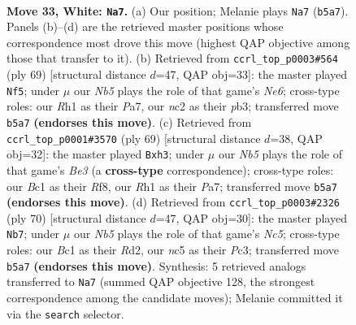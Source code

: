 \documentclass[11pt]{article}
\begin{document}
\clearpage

\begin{figure}[p]\centering
\begin{subfigure}{0.46\textwidth}\centering
\resizebox{\linewidth}{!}{%
\newchessgame
\chessboard[
  setfen={5r2/1ppkp2p/6p1/pNn5/5P1P/2P5/P1n2PK1/2B4R w - - 11 33},
  showmover=false,
  pgfstyle=straightmove, color=movearrow, markmove={b5-a7}
]}
\caption{}
\end{subfigure}\hfill
\begin{subfigure}{0.46\textwidth}\centering
\resizebox{\linewidth}{!}{%
\newchessgame
\chessboard[
  setfen={8/pp2pk2/4p2r/3p4/5P1P/PP2nN2/2P5/2K3R1 b - - 1 35},
  showmover=false,
  pgfstyle=straightmove, color=movearrow, markmove={e3-f5}
]}
\caption{}
\end{subfigure}
\\[4pt]
\begin{subfigure}{0.46\textwidth}\centering
\resizebox{\linewidth}{!}{%
\newchessgame
\chessboard[
  setfen={5r2/p5kp/2pnb3/8/P1pP1p2/2P2P1P/3N1KN1/1R6 b - - 4 35},
  showmover=false,
  pgfstyle=straightmove, color=movearrow, markmove={e6-h3}
]}
\caption{}
\end{subfigure}\hfill
\begin{subfigure}{0.46\textwidth}\centering
\resizebox{\linewidth}{!}{%
\newchessgame
\chessboard[
  setfen={7r/5p2/2p1p1k1/p1N5/P5p1/2P1n1P1/1P1R3P/2K5 w - - 2 36},
  showmover=false,
  pgfstyle=straightmove, color=movearrow, markmove={c5-b7}
]}
\caption{}
\end{subfigure}
\caption{\textbf{Move 33, White: \texttt{Na7}.} (a) Our position; Melanie plays \texttt{Na7} (\texttt{b5a7}). Panels (b)--(d) are the retrieved master positions whose correspondence most drove this move (highest QAP objective among those that transfer to it). (b) Retrieved from \texttt{ccrl\_top\_p0003\#564} (ply 69) [structural distance $d$=47, QAP obj=33]: the master played \texttt{Nf5}; under $\mu$ our \emph{Nb5} plays the role of that game's \emph{Ne6}; cross-type roles: our \emph{R}h1 as their \emph{P}a7, our \emph{n}c2 as their \emph{p}b3; transferred move \texttt{b5a7} \textbf{(endorses this move)}. (c) Retrieved from \texttt{ccrl\_top\_p0001\#3570} (ply 69) [structural distance $d$=38, QAP obj=32]: the master played \texttt{Bxh3}; under $\mu$ our \emph{Nb5} plays the role of that game's \emph{Be3} (a \textbf{cross-type} correspondence); cross-type roles: our \emph{B}c1 as their \emph{R}f8, our \emph{R}h1 as their \emph{P}a7; transferred move \texttt{b5a7} \textbf{(endorses this move)}. (d) Retrieved from \texttt{ccrl\_top\_p0003\#2326} (ply 70) [structural distance $d$=47, QAP obj=30]: the master played \texttt{Nb7}; under $\mu$ our \emph{Nb5} plays the role of that game's \emph{Nc5}; cross-type roles: our \emph{B}c1 as their \emph{R}d2, our \emph{n}c5 as their \emph{P}c3; transferred move \texttt{b5a7} \textbf{(endorses this move)}. Synthesis: 5 retrieved analogs transferred to \texttt{Na7} (summed QAP objective 128, the strongest correspondence among the candidate moves); Melanie committed it via the \texttt{search} selector.}
\label{fig:thought-m64}
\end{figure}
\end{document}
